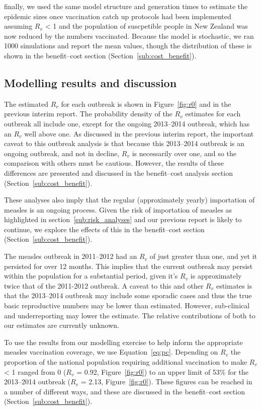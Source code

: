 \documentclass{article}
\begin{document}
finally, we used the same model structure and generation times to estimate the epidemic sizes once vaccination catch up protocols had been implemented assuming $R_v$ < 1 and the population of suscpetible people in New Zealand was now reduced by the numbers vaccinated. Because the model is stochastic, we ran 1000 simulations and report the mean values, though the distribution of these is shown in the benefit--cost section (Section~\ref{sub:cost_benefit}).

\subsection{Modelling results and discussion}

The estimated $R_v$ for each outbreak is shown in Figure~\ref{fig:r0} and in the previous interim report. The probability density of the $R_v$ estimates for each outbreak all include one, except for the ongoing 2013--2014 outbreak, which has an $R_v$ well above one. As discussed in the previous interim report, the important caveat to this outbreak analysis is that because this 2013--2014 outbreak is an ongoing outbreak, and not in decline, $R_v$ is necessarily over one, and so the comparison with others must be cautious. However, the results of these differences are presented and discussed in the benefit--cost analysis section (Section~\ref{sub:cost_benefit}).

These analyses also imply that the regular (approximately yearly) importation of measles is an ongoing process. Given the risk of importation of measles as highlighted in section~\ref{sub:risk_analyses} and our previous report is likely to continue, we explore the effects of this in the benefit--cost section (Section~\ref{sub:cost_benefit}).

The measles outbreak in 2011--2012 had an $R_v$ of just greater than one, and yet it persisted for over 12 months. This implies that the current outbreak may persist within the population for a substantial period, given it's $R_v$ is approximately twice that of the 2011-2012 outbreak. A caveat to this and other $R_v$ estimates is that the 2013--2014 outbreak may include some sporadic cases and thus the true basic reproductive numbers may be lower than estimated. However, sub-clinical and underreporting may lower the estimate. The relative contributions of both to our estimates are currently unknown.

To use the results from our modelling exercise to help inform the appropriate measles vaccination coverage, we use Equation~\ref{eq:pc}. Depending on $R_v$ the proportion of the national population requiring additional vaccination to make $R_v$ < 1 ranged from 0 ($R_v$ = 0.92, Figure~\ref{fig:r0}) to an upper limit of 53\% for the 2013--2014 outbreak ($R_v$ = 2.13, Figure~\ref{fig:r0}). These figures can be reached in a number of different ways, and these are discussed in the benefit--cost section (Section~\ref{sub:cost_benefit}).
\end{document}
